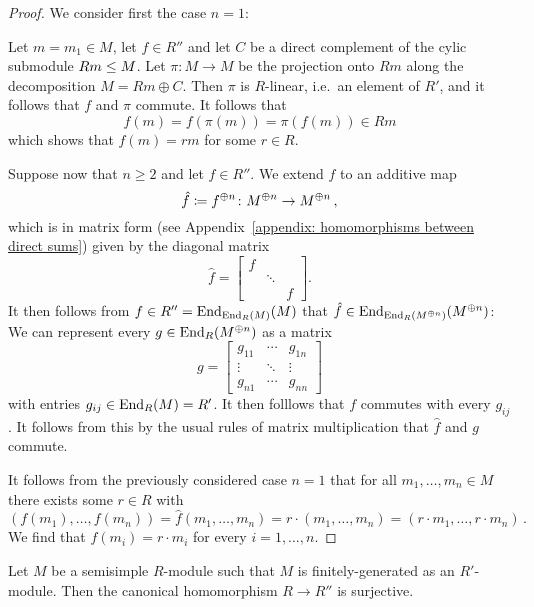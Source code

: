 \begin{proof}
  We consider first the case $n = 1$:
  
  Let $m = m_1 \in M$, let $f \in R''$ and let $C$ be a direct complement of the cylic submodule $Rm \leq M$.
  Let $\pi \colon M \to M$ be the projection onto $Rm$ along the decomposition $M = Rm \oplus C$.
  Then $\pi$ is $R$-linear, i.e.\ an element of $R'$, and it follows that $f$ and $\pi$ commute.
  It follows that
  \[
        f(m)
    =   f(\pi(m))
    =   \pi(f(m))
    \in Rm
  \]
  which shows that $f(m) = rm$ for some $r \in R$.
  
  Suppose now that $n \geq 2$ and let $f \in R''$.
  We extend $f$ to an additive map
  \[
              \hat{f}
    \coloneqq  f^{\oplus n}
    \colon    M^{\oplus n}
    \to       M^{\oplus n} \,,
  \]
  which is in matrix form (see Appendix~\ref{appendix: homomorphisms between direct sums}) given by the diagonal matrix
  \[
      \hat{f}
    = \begin{bmatrix}
        f &         &   \\  
          & \ddots  &   \\
          &         & f
      \end{bmatrix}.
  \]
  It then follows from $f \in R'' = \operatorname{End}_{\operatorname{End}_R(M)}(M)$ that $\hat{f} \in \operatorname{End}_{\operatorname{End}_R(M^{\oplus n})}(M^{\oplus n})$:
  We can represent every $g \in \operatorname{End}_R(M^{\oplus n})$ as a matrix
  \[
      g
    = \begin{bmatrix}
        g_{11}  & \cdots  & g_{1n}  \\
        \vdots  & \ddots  & \vdots  \\
        g_{n1}  & \cdots  & g_{nn}
      \end{bmatrix}
  \]
  with entries $g_{ij} \in \operatorname{End}_R(M) = R'$.
  It then folllows that $f$ commutes with every $g_{ij}$.
  It follows from this by the usual rules of matrix multiplication that $\hat{f}$ and $g$ commute.
  
  It follows from the previously considered case $n = 1$ that for all $m_1, \dotsc, m_n \in M$ there exists some $r \in R$ with
  \[
      (f(m_1), \dotsc, f(m_n))
    = \hat{f}(m_1, \dotsc, m_n)
    = r \cdot (m_1, \dotsc, m_n)
    = (r \cdot m_1, \dotsc, r \cdot m_n) \,.
  \]
  We find that $f(m_i) = r \cdot m_i$ for every $i = 1, \dotsc, n$.
\end{proof}


\begin{corollary}
  Let $M$ be a semisimple $R$-module such that $M$ is finitely-generated as an $R'$-module.
  Then the canonical homomorphism $R \to R''$ is surjective.
\end{corollary}


